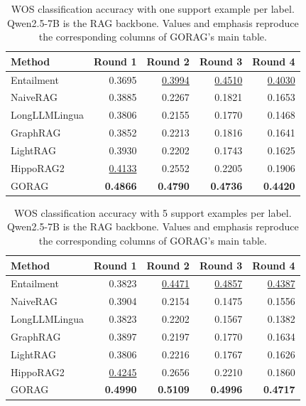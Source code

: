 \begin{table}[tbp]
\centering
\caption{WOS classification accuracy with one support example per label. Qwen2.5-7B is the RAG backbone. Values and emphasis reproduce the corresponding columns of GORAG's main table.}
\label{tab:gorag:main-wos}
\small
\begin{tabular}{lrrrr}
\hline
Method & Round 1 & Round 2 & Round 3 & Round 4\\
\hline
Entailment & {0.3695} & \underline{0.3994} & \underline{0.4510} & \underline{0.4030} \\
NaiveRAG & 0.3885 & 0.2267 & 0.1821 & 0.1653 \\
LongLLMLingua & 0.3806 & 0.2155 & 0.1770 & 0.1468 \\
GraphRAG & 0.3852 & 0.2213 & 0.1816 & 0.1641 \\
LightRAG & {0.3930} & 0.2202 & 0.1743 & 0.1625 \\
HippoRAG2 & \underline{0.4133} & 0.2552 & 0.2205 & 0.1906 \\
GORAG & \textbf{0.4866} & \textbf{0.4790} & \textbf{0.4736} & \textbf{0.4420} \\
\hline
\end{tabular}
\end{table}

\begin{table}[tbp]
\centering
\caption{WOS classification accuracy with 5 support examples per label. Qwen2.5-7B is the RAG backbone. Values and emphasis reproduce the corresponding columns of GORAG's main table.}
\label{tab:gorag:main-wos-5shot}
\small
\begin{tabular}{lrrrr}
\hline
Method & Round 1 & Round 2 & Round 3 & Round 4\\
\hline
Entailment & {0.3823} & \underline{0.4471} & \underline{0.4857} & \underline{0.4387} \\
NaiveRAG & {0.3904} & 0.2154 & 0.1475 & 0.1556 \\
LongLLMLingua & 0.3823 & 0.2202 & 0.1567 & 0.1382 \\
GraphRAG & 0.3897 & 0.2197 & 0.1770 & 0.1634 \\
LightRAG & 0.3806 & 0.2216 & 0.1767 & 0.1626 \\
HippoRAG2 & \underline{0.4245} & 0.2656 & 0.2210 & 0.1860 \\
GORAG & \textbf{0.4990} & \textbf{0.5109} & \textbf{0.4996} & \textbf{0.4717} \\
\hline
\end{tabular}
\end{table}

